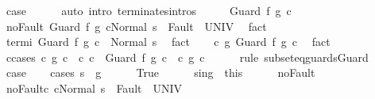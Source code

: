 \begin{isabellebody}
\ {\isacharquery}case\isanewline
\ \ \ \ \isamarkupfalse%
\ {\isacharparenleft}auto\ intro{\isacharcolon}\ terminates{\isachardot}intros{\isacharparenright}\isanewline
{}\isamarkupfalse%
\ \isanewline
\ \ \isamarkupfalse%
\ {\isacharparenleft}Guard\ f{\isacharprime}\ g{\isacharprime}\ c{\isacharprime}{\isacharparenright}\isanewline
\ \ \isamarkupfalse%
\ noFault{\isacharcolon}\ {\isachardoublequoteopen}{\isasymGamma}{\isasymturnstile}{\isasymlangle}Guard\ f{\isacharprime}\ g{\isacharprime}\ c{\isacharprime}{\isacharcomma}Normal\ s\ {\isasymrangle}\ {\isasymRightarrow}{\isasymnotin}Fault\ {\isacharbackquote}\ UNIV{\isachardoublequoteclose}\ \isamarkupfalse%
\ fact\isanewline
\ \ \isamarkupfalse%
\ termi{\isacharcolon}\ {\isachardoublequoteopen}{\isasymGamma}{\isasymturnstile}Guard\ f{\isacharprime}\ g{\isacharprime}\ c{\isacharprime}\ {\isasymdown}\ Normal\ s{\isachardoublequoteclose}\ \isamarkupfalse%
\ fact\isanewline
\ \ \isamarkupfalse%
\ {\isachardoublequoteopen}c\ {\isasymsubseteq}\isactrlsub g\ Guard\ f{\isacharprime}\ g{\isacharprime}\ c{\isacharprime}{\isachardoublequoteclose}\ \isamarkupfalse%
\ fact\isanewline
\ \ \isamarkupfalse%
\ c{\isacharunderscore}cases{\isacharcolon}\ {\isachardoublequoteopen}{\isacharparenleft}c\ {\isasymsubseteq}\isactrlsub g\ c{\isacharprime}{\isacharparenright}\ {\isasymor}\ {\isacharparenleft}{\isasymexists}c{\isacharprime}{\isacharprime}{\isachardot}\ c\ {\isacharequal}\ Guard\ f{\isacharprime}\ g{\isacharprime}\ c{\isacharprime}{\isacharprime}\ {\isasymand}\ {\isacharparenleft}c{\isacharprime}{\isacharprime}\ {\isasymsubseteq}\isactrlsub g\ c{\isacharprime}{\isacharparenright}{\isacharparenright}{\isachardoublequoteclose}\isanewline
\ \ \ \ \isamarkupfalse%
\ {\isacharparenleft}rule\ subseteq{\isacharunderscore}guards{\isacharunderscore}Guard{\isacharparenright}\isanewline
\ \ \isamarkupfalse%
\ {\isacharquery}case\isanewline
\ \ \isamarkupfalse%
\ {\isacharparenleft}cases\ {\isachardoublequoteopen}s\ {\isasymin}\ g{\isacharprime}{\isachardoublequoteclose}{\isacharparenright}\isanewline
\ \ \ \ \isamarkupfalse%
\ True\isanewline
\ \ \ \ \isamarkupfalse%
\ s{\isacharunderscore}in{\isacharunderscore}g{\isacharprime}\ {\isacharequal}\ this\isanewline
\ \ \ \ \isamarkupfalse%
\ noFault\ \isamarkupfalse%
\ noFault{\isacharunderscore}c{\isacharprime}{\isacharcolon}\ {\isachardoublequoteopen}{\isasymGamma}{\isasymturnstile}{\isasymlangle}c{\isacharprime}{\isacharcomma}Normal\ s\ {\isasymrangle}\ {\isasymRightarrow}{\isasymnotin}Fault\ {\isacharbackquote}\ UNIV{\isachardoublequoteclose}\isanewline

\end{isabellebody}

